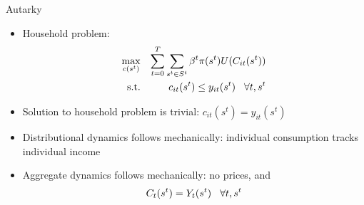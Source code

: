 \documentclass[9pt]{beamer}
\newcommand{\bit}{\begin{itemize}}
\newcommand{\eit}{\end{itemize}}
\begin{document}
\begin{frame}{Autarky}

\bit
\setlength\itemsep{1em}

\item Household problem:
\begin{eqnarray}
\max_{c(s^t)} && \sum_{t=0}^{T} \sum_{s^t \in S^t} \beta^t \pi (s^t) U(C_{it}(s^t)) \nonumber \\
\text{s.t.} && c_{it}(s^t) \leq y_{it}(s^t) \hspace{3mm} \forall t,s^t \nonumber
\end{eqnarray}

\item Solution to household problem is trivial: $c_{it}(s^t) = y_{it}(s^t) $

\item Distributional dynamics follows mechanically: individual consumption tracks individual income

\item Aggregate dynamics follows mechanically: no prices, and 
\begin{eqnarray}
C_{t}(s^t) = Y_{t}(s^t) \hspace{3mm} \forall t,s^t \nonumber
\end{eqnarray}

\eit

\end{frame}
\end{document}
